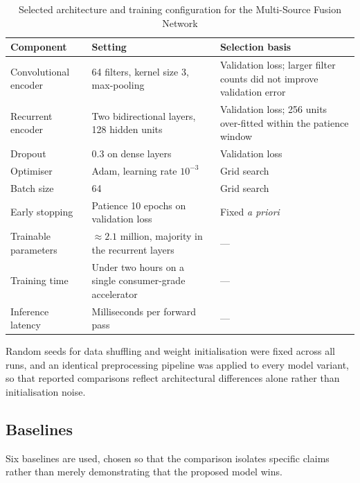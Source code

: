 \begin{table}[!htb]
\centering
\caption[Selected architecture and training configuration]{Selected architecture and training
configuration for the Multi-Source Fusion Network}
\label{tab:msfn-hyper}
\tabfont
\begin{tabular}{@{}L{5.0cm}L{4.2cm}L{4.6cm}@{}}
\toprule
\textbf{Component} & \textbf{Setting} & \textbf{Selection basis} \\
\midrule
Convolutional encoder & 64 filters, kernel size 3, max-pooling & Validation loss; larger filter
counts did not improve validation error \\
Recurrent encoder & Two bidirectional layers, 128 hidden units & Validation loss; 256 units
over-fitted within the patience window \\
Dropout & 0.3 on dense layers & Validation loss \\
Optimiser & Adam, learning rate $10^{-3}$~\cite{kingma2015adam} & Grid search \\
Batch size & 64 & Grid search \\
Early stopping & Patience 10 epochs on validation loss & Fixed \emph{a priori} \\
Trainable parameters & $\approx 2.1$ million, majority in the recurrent layers & --- \\
Training time & Under two hours on a single consumer-grade accelerator & --- \\
Inference latency & Milliseconds per forward pass & --- \\
\bottomrule
\end{tabular}
\end{table}

Random seeds for data shuffling and weight initialisation were fixed across all runs, and an
identical preprocessing pipeline was applied to every model variant, so that reported
comparisons reflect architectural differences alone rather than initialisation noise.

\subsection{Baselines}

Six baselines are used, chosen so that the comparison isolates specific claims rather than
merely demonstrating that the proposed model wins.

